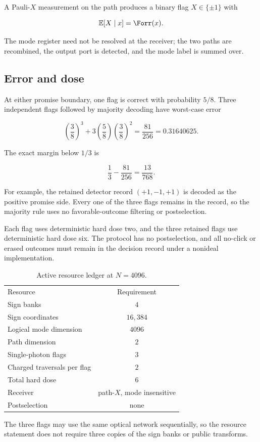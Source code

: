 A Pauli-$X$ measurement on the path produces a binary flag $X\in\{\pm1\}$ with

\begin{equation}
\mathbb E[X\mid x]=\Forr(x).
\end{equation}

The mode register need not be resolved at the receiver; the two paths are recombined, the output port is detected, and the mode label is summed over.

\subsection{Error and dose}

At either promise boundary, one flag is correct with probability $5/8$. Three independent flags followed by majority decoding have worst-case error

\begin{equation}
\left(\frac38\right)^3
+3\left(\frac58\right)\left(\frac38\right)^2
=\frac{81}{256}
=0.31640625.
\end{equation}

The exact margin below $1/3$ is

\begin{equation}
\frac13-\frac{81}{256}=\frac{13}{768}.
\end{equation}

For example, the retained detector record $(+1,-1,+1)$ is decoded as the positive promise side. Every one of the three flags remains in the record, so the majority rule uses no favorable-outcome filtering or postselection.

Each flag uses deterministic hard dose two, and the three retained flags use deterministic hard dose six. The protocol has no postselection, and all no-click or erased outcomes must remain in the decision record under a nonideal implementation.

\begin{table}[t]
\caption{Active resource ledger at $N=4096$.}
\label{tab:active-resources}
\begin{ruledtabular}
\begin{tabular}{lc}
Resource & Requirement \\
\colrule
Sign banks & $4$ \\
Sign coordinates & $16{,}384$ \\
Logical mode dimension & $4096$ \\
Path dimension & $2$ \\
Single-photon flags & $3$ \\
Charged traversals per flag & $2$ \\
Total hard dose & $6$ \\
Receiver & path-$X$, mode insensitive \\
Postselection & none \\
\end{tabular}
\end{ruledtabular}
\end{table}

The three flags may use the same optical network sequentially, so the resource statement does not require three copies of the sign banks or public transforms.
